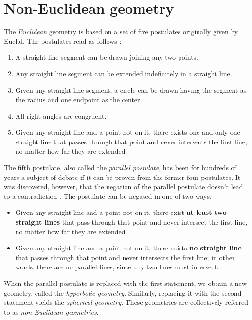\section{Non-Euclidean geometry}

The \textit{Euclidean} geometry is based on a set of five postulates originally given by Euclid.
The postulates read as follows \cite{Weisstein-Postulates}:
\begin{enumerate}
    \item A straight line segment can be drawn joining any two points.
    \item Any straight line segment can be extended indefinitely in a straight line.
    \item Given any straight line segment, a circle can be drawn having the segment as the radius and one endpoint as the center.
    \item All right angles are congruent.
    \item Given any straight line and a point not on it, there exists one and only one straight line that passes through that point and never intersects the first line, no matter how far they are extended. \cite{Weisstein-Parallel}
\end{enumerate}
The fifth postulate, also called the \textit{parallel postulate}, has been for hundreds of years a subject of debate if it can be proven from the former four postulates.
It was discovered, however, that the negation of the parallel postulate doesn't lead to a contradiction \cite{Parallel-Postulate}.
The postulate can be negated in one of two ways.
\begin{itemize}
    \item Given any straight line and a point not on it, there exist \textbf{at least two straight lines} that pass through that point and never intersect the first line, no matter how far they are extended.
    \item Given any straight line and a point not on it, there exists \textbf{no straight line} that passes through that point and never intersects the first line; in other words, there are no parallel lines, since any two lines must intersect.
\end{itemize}

When the parallel postulate is replaced with the first statement, we obtain a new geometry, called the \textit{hyperbolic geometry}.
Similarly, replacing it with the second statement yields the \textit{spherical geometry}.
These geometries are collectively referred to as \textit{non-Euclidean geometries}.




